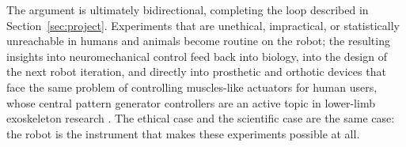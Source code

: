 The argument is ultimately bidirectional, completing the loop described in Section~\ref{sec:project}. Experiments that are unethical, impractical, or statistically unreachable in humans and animals become routine on the robot; the resulting insights into neuromechanical control feed back into biology, into the design of the next robot iteration, and directly into prosthetic and orthotic devices that face the same problem of controlling muscles-like actuators for human users, whose central pattern generator controllers are an active topic in lower-limb exoskeleton research \citep{duan_gait_2024, pery_benchmarking_2026}. The ethical case and the scientific case are the same case: the robot is the instrument that makes these experiments possible at all.
